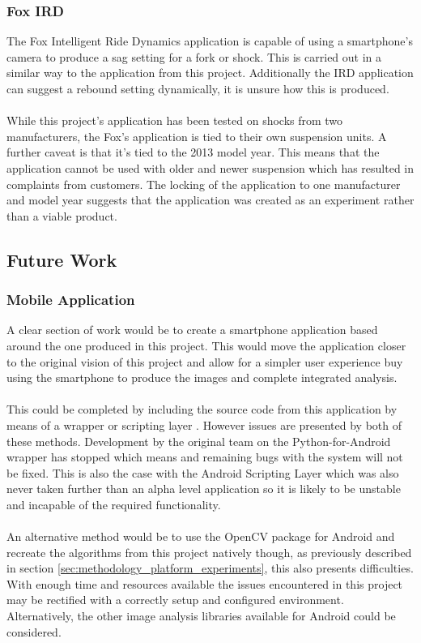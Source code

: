 		\subsubsection{Fox IRD}
			The Fox Intelligent Ride Dynamics application \cite{fox2015ird} is capable of using a smartphone's camera to produce a sag setting for a fork or shock. This is carried out in a similar way to the application from this project. Additionally the IRD application can suggest a rebound setting dynamically, it is unsure how this is produced.
			\\\\
			While this project's application has been tested on shocks from two manufacturers, the Fox's application is tied to their own suspension units. A further caveat is that it's tied to the 2013 model year. This means that the application cannot be used with older and newer suspension which has resulted in complaints from customers. The locking of the application to one manufacturer and model year suggests that the application was created as an experiment rather than a viable product.
	\subsection{Future Work}\label{sec:conclusion_future_work}
		\subsubsection{Mobile Application}
			A clear section of work would be to create a smartphone application based around the one produced in this project. This would move the application closer to the original vision of this project and allow for a simpler user experience buy using the smartphone to produce the images and complete integrated analysis.
			\\\\
			This could be completed by including the source code from this application by means of a wrapper \citep{kivy2015python} or scripting layer \citep{asl}. However issues are presented by both of these methods. Development by the original team on the Python-for-Android wrapper has stopped which means and remaining bugs with the system will not be fixed. This is also the case with the Android Scripting Layer which was also never taken further than an alpha level application so it is likely to be unstable and incapable of the required functionality.
			\\\\
			An alternative method would be to use the OpenCV package for Android and recreate the algorithms from this project natively though, as previously described in section \ref{sec:methodology_platform_experiments}, this also presents difficulties. With enough time and resources available the issues encountered in this project may be rectified with a correctly setup and configured environment. Alternatively, the other image analysis libraries available for Android could be considered.
